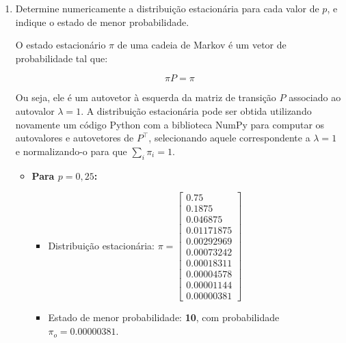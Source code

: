 \begin{enumerate}
\begin{resposta}
    \end{resposta}
    \item Determine numericamente a distribuição estacionária para cada valor de $p$, e indique o estado de menor probabilidade.
    \begin{resposta}
        O estado estacionário $\pi$ de uma cadeia de Markov é um vetor de probabilidade tal que:

        $$ \pi P = \pi $$

        Ou seja, ele é um autovetor à esquerda da matriz de transição $P$ associado ao autovalor $\lambda = 1$. 
        A distribuição estacionária pode ser obtida utilizando novamente um código Python com a biblioteca NumPy para computar os autovalores e autovetores de $P^\top$, selecionando aquele correspondente a $\lambda = 1$ e normalizando-o para que $\sum_i \pi_i = 1$.

        \begin{itemize}
            \item \textbf{Para $p = 0{,}25$:}
            \begin{itemize}
                \item Distribuição estacionária:
                $
                \pi = 
                \begin{bmatrix}
                0.75 \\
                0.1875 \\
                0.046875 \\
                0.01171875 \\
                0.00292969 \\
                0.00073242 \\
                0.00018311 \\
                0.00004578 \\
                0.00001144 \\
                \boxed{0.00000381}
                \end{bmatrix}
                $
                \item Estado de menor probabilidade: \textbf{10}, com probabilidade $\boxed{\pi_o = 0.00000381}$.
            \end{itemize}


\end{itemize}
\end{resposta}
\end{enumerate}
